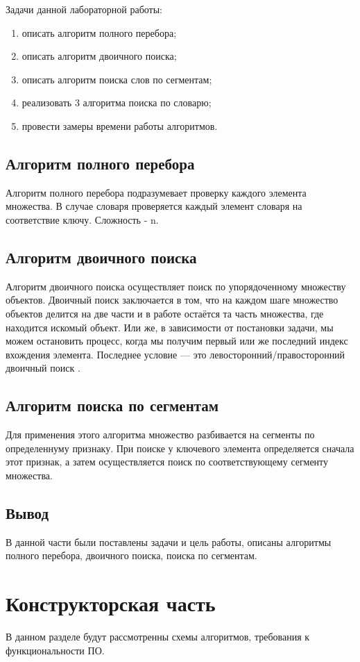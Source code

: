 \documentclass{article}
\begin{document}
    Задачи данной лабораторной работы:
    \begin{enumerate}
        \item описать алгоритм полного перебора;
        \item описать алгоритм двоичного поиска;
        \item описать алгоритм поиска слов по сегментам;
        \item реализовать 3 алгоритма поиска по словарю;
        \item провести замеры времени работы алгоритмов.
    \end{enumerate}

		\subsection{Алгоритм полного перебора}
		Алгоритм полного перебора подразумевает проверку каждого элемента множества.  В случае словаря проверяется каждый элемент словаря на соответствие ключу.
Сложность - n.
		\subsection{Алгоритм двоичного поиска}
		Алгоритм двоичного поиска осуществляет поиск по упорядоченному множеству объектов. \newline
		\indent Двоичный поиск заключается в том, что на каждом шаге множество объектов делится на две части и в работе остаётся та часть множества, где находится искомый объект. Или же, в зависимости от постановки задачи, мы можем остановить процесс, когда мы получим первый или же последний индекс вхождения элемента. Последнее условие — это левосторонний/правосторонний двоичный поиск \cite{binary-search}.
		\subsection{Алгоритм поиска по сегментам}
		\indent Для применения этого алгоритма множество разбивается на сегменты по определеннуму признаку. При поиске у ключевого элемента определяется сначала этот признак, а затем осуществляется поиск по соответствующему сегменту множества.
	\subsection{Вывод}
	В данной части были поставлены задачи и цель работы, описаны алгоритмы полного перебора, двоичного поиска, поиска по сегментам.
	\newpage
	\section{Конструкторская часть}
		В данном разделе будут рассмотренны схемы алгоритмов, требования к функциональности ПО.
\end{document}
